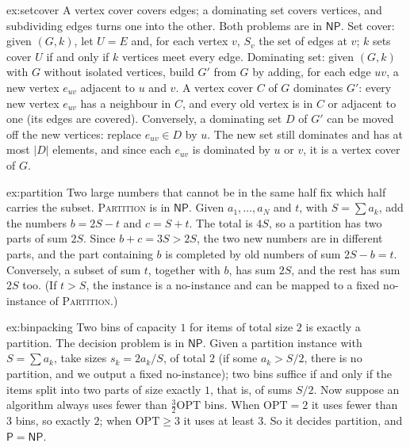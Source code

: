\begin{solution}{ex:setcover}
\idea A vertex cover covers edges; a dominating set covers vertices, and subdividing edges turns one into the other.
\writeup Both problems are in $\mathsf{NP}$. Set cover: given $(G,k)$, let $U=E$ and, for each vertex $v$, $S_v$ the set of edges at $v$; $k$ sets cover $U$ if and only if $k$ vertices meet every edge. Dominating set: given $(G,k)$ with $G$ without isolated vertices, build $G'$ from $G$ by adding, for each edge $uv$, a new vertex $e_{uv}$ adjacent to $u$ and $v$. A vertex cover $C$ of $G$ dominates $G'$: every new vertex $e_{uv}$ has a neighbour in $C$, and every old vertex is in $C$ or adjacent to one (its edges are covered). Conversely, a dominating set $D$ of $G'$ can be moved off the new vertices: replace $e_{uv}\in D$ by $u$. The new set still dominates and has at most $|D|$ elements, and since each $e_{uv}$ is dominated by $u$ or $v$, it is a vertex cover of $G$.
\end{solution}

\begin{solution}{ex:partition}
\idea Two large numbers that cannot be in the same half fix which half carries the subset.
\writeup \textup{\textsc{Partition}} is in $\mathsf{NP}$. Given $a_1,\dots,a_N$ and $t$, with $S=\sum a_k$, add the numbers $b=2S-t$ and $c=S+t$. The total is $4S$, so a partition has two parts of sum $2S$. Since $b+c=3S>2S$, the two new numbers are in different parts, and the part containing $b$ is completed by old numbers of sum $2S-b=t$. Conversely, a subset of sum $t$, together with $b$, has sum $2S$, and the rest has sum $2S$ too. (If $t>S$, the instance is a no-instance and can be mapped to a fixed no-instance of \textup{\textsc{Partition}}.)
\end{solution}

\begin{solution}{ex:binpacking}
\idea Two bins of capacity $1$ for items of total size $2$ is exactly a partition.
\writeup The decision problem is in $\mathsf{NP}$. Given a partition instance with $S=\sum a_k$, take sizes $s_k=2a_k/S$, of total $2$ (if some $a_k>S/2$, there is no partition, and we output a fixed no-instance); two bins suffice if and only if the items split into two parts of size exactly $1$, that is, of sums $S/2$. Now suppose an algorithm always uses fewer than $\frac32\mathrm{OPT}$ bins. When $\mathrm{OPT}=2$ it uses fewer than $3$ bins, so exactly $2$; when $\mathrm{OPT}\ge3$ it uses at least $3$. So it decides partition, and $\mathsf P=\mathsf{NP}$.
\end{solution}

